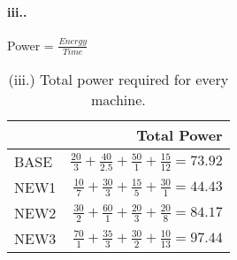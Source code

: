 \documentclass[12pt]{article}
\newcommand{\partt}[1]{\paragraph*{{#1}.}}
\begin{document}
\partt{iii.} Power = $\frac{Energy}{Time}$  

\begin{table}[h]
\center
\begin{tabular}{|l|r|}
	\hline
	 & \textbf{Total Power} \\
	\hline
	BASE & $\frac{20}{3} + \frac{40}{2.5} + \frac{50}{1} + \frac{15}{12} = 73.92$  \\
	\hline
	NEW1 & $\frac{10}{7} + \frac{30}{3} + \frac{15}{5} + \frac{30}{1} = 44.43$ \\
	\hline
	NEW2 & $\frac{30}{2} + \frac{60}{1} + \frac{20}{3} + \frac{20}{8} = 84.17$ \\
	\hline
	NEW3 & $\frac{70}{1} + \frac{35}{3} + \frac{30}{2} + \frac{10}{13} = 97.44$ \\
	\hline
\end{tabular}
\caption{(iii.) Total power required for every machine.}
\label{tbl:wext}
\end{table}
\end{document}
